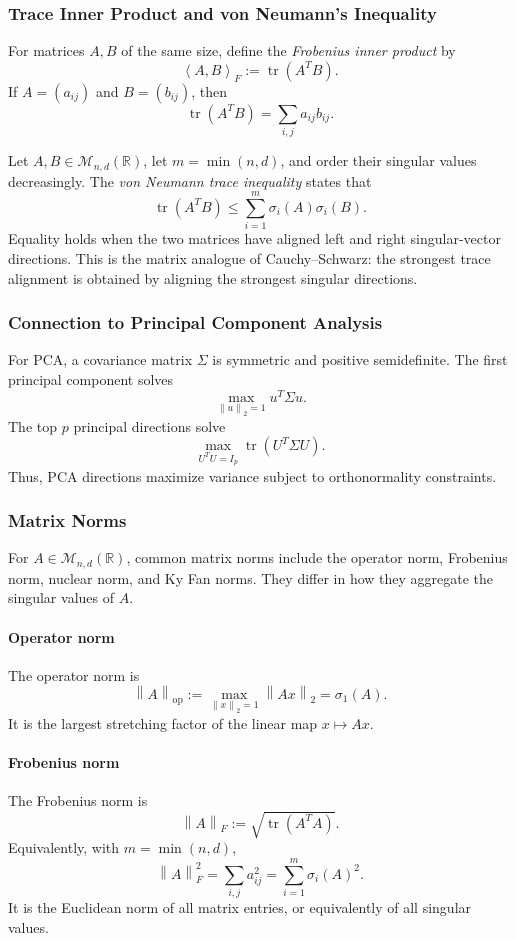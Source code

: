\documentclass[12pt,oneside]{book}
\numberwithin{equation}{section}
\theoremstyle{definition}
\theoremstyle{plain}
\theoremstyle{remark}
\newcommand{\R}{\mathbb{R}}
\newcommand{\norm}[1]{\left\lVert #1 \right\rVert}
\newcommand{\inner}[2]{\left\langle #1, #2 \right\rangle}
\newcommand{\tr}{\operatorname{tr}}
\begin{document}
\subsubsection{Trace Inner Product and von Neumann's Inequality}
For matrices $A,B$ of the same size, define the \emph{Frobenius inner product} by
\[
\inner{A}{B}_F:=\tr(A^TB).
\]
If $A=(a_{ij})$ and $B=(b_{ij})$, then
\[
\tr(A^TB)=\sum_{i,j}a_{ij}b_{ij}.
\]

Let $A,B\in\mathcal{M}_{n,d}(\R)$, let $m=\min(n,d)$, and order their singular values decreasingly. The \emph{von Neumann trace inequality} states that
\[
\tr(A^TB)
\leq\sum_{i=1}^m\sigma_i(A)\sigma_i(B).
\]
Equality holds when the two matrices have aligned left and right singular-vector directions. This is the matrix analogue of Cauchy--Schwarz: the strongest trace alignment is obtained by aligning the strongest singular directions.

\subsubsection{Connection to Principal Component Analysis}
For PCA, a covariance matrix $\Sigma$ is symmetric and positive semidefinite. The first principal component solves
\[
\max_{\norm{u}_2=1}u^T\Sigma u.
\]
The top $p$ principal directions solve
\[
\max_{U^TU=I_p}\tr(U^T\Sigma U).
\]
Thus, PCA directions maximize variance subject to orthonormality constraints.

\subsubsection{Matrix Norms}
For $A\in\mathcal{M}_{n,d}(\R)$, common matrix norms include the operator norm, Frobenius norm, nuclear norm, and Ky Fan norms. They differ in how they aggregate the singular values of $A$.

\paragraph{Operator norm}
The operator norm is
\[
\norm{A}_{\mathrm{op}}
:=\max_{\norm{x}_2=1}\norm{Ax}_2
=\sigma_1(A).
\]
It is the largest stretching factor of the linear map $x\mapsto Ax$.

\paragraph{Frobenius norm}
The Frobenius norm is
\[
\norm{A}_F:=\sqrt{\tr(A^TA)}.
\]
Equivalently, with $m=\min(n,d)$,
\[
\norm{A}_F^2
=\sum_{i,j}a_{ij}^2
=\sum_{i=1}^m\sigma_i(A)^2.
\]
It is the Euclidean norm of all matrix entries, or equivalently of all singular values.
\end{document}

